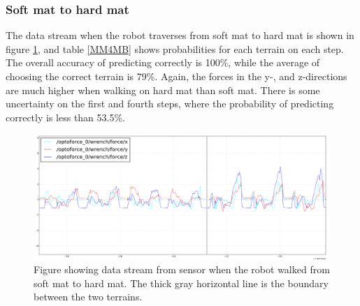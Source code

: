 \documentclass[USenglish]{ifimaster}  %
\begin{document}
\subsubsection{Soft mat to hard mat}
The data stream when the robot traverses from soft mat to hard mat is shown in figure \ref{fig:MM_4_Resten_BGraf}, and table \ref{MM4MB} shows probabilities for each terrain on each step. The overall accuracy of predicting correctly is 100\%, while the average of choosing the correct terrain is 79\%. Again, the forces in the y-, and z-directions are much higher when walking on hard mat than soft mat. There is some uncertainty on the first and fourth steps, where the probability of predicting correctly is less than 53.5\%.

	\begin{figure}[h]
		\centering
		\includegraphics[width=\textwidth,height=\textheight,keepaspectratio]{Figures/MM_4Resten_MB_line2}
		\caption[Data stream of the transition from soft mat to hard mat]{Figure showing data stream from sensor when the robot walked from soft mat to hard mat. The thick gray horizontal line is the boundary between the two terrains.}
		\label{fig:MM_4_Resten_BGraf}
	\end{figure}
	
	\begin{table}[h]
		\centering
		\caption[Results of transistion from soft mat to hard mat]{Estimated probability of each terrain per step walking from soft mat to hard mat.Values are marked green to represent correct predictions. For incorrect predictions, the actual value is marked yellow while the predicted value is marked red.}
		\label{MM4MB}
	\end{table}
	\FloatBarrier
	\clearpage
\end{document}
